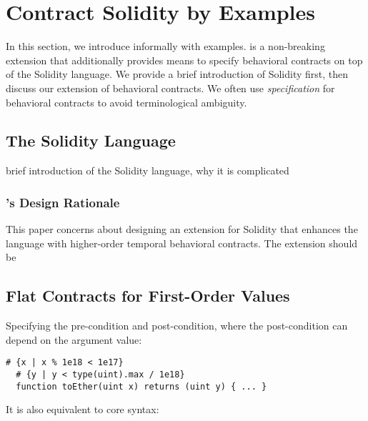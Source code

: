 
\section{Contract Solidity by Examples}

In this section, we introduce \lang informally with examples.
\lang is a non-breaking extension that additionally provides means
to specify behavioral contracts on top of the Solidity language.
We provide a brief introduction of Solidity first, then discuss our extension
of behavioral contracts.
We often use \emph{specification} for behavioral contracts to avoid terminological ambiguity.

\subsection{The Solidity Language}

brief introduction of the Solidity language, why it is complicated

\subsubsection*{\textbf{\lang's Design Rationale}}
This paper concerns about designing an extension for Solidity that enhances the
language with higher-order temporal behavioral contracts.
The extension should be

\subsection{Flat Contracts for First-Order Values}

Specifying the pre-condition and post-condition, where the post-condition
can depend on the argument value:


\begin{lstlisting}[language=Solidity]
  # {x | x % 1e18 < 1e17}
  # {y | y < type(uint).max / 1e18}
  function toEther(uint x) returns (uint y) { ... }
\end{lstlisting}

It is also equivalent to core syntax:


